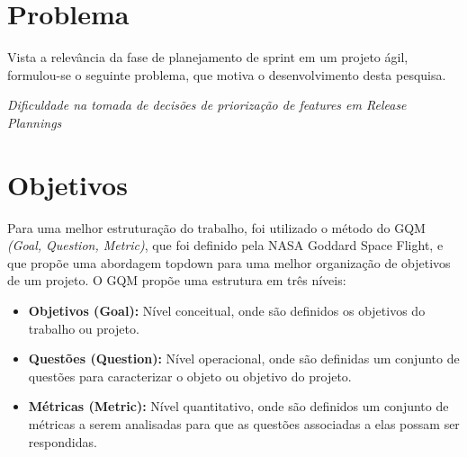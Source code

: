\section{Problema}
\label{int:pro}
Vista a relevância da fase de planejamento de sprint em um projeto ágil,
formulou-se o seguinte problema, que motiva o desenvolvimento desta pesquisa.




\begin{center}
 \textit{Dificuldade na tomada de decisões de priorização de features em
  Release Plannings}
\end{center}


\section{Objetivos}
\label{int:obj}
Para uma melhor estruturação do trabalho, foi utilizado o método do
GQM \textit{(Goal, Question, Metric)}, que foi definido pela NASA Goddard Space
Flight, e que propõe uma abordagem topdown para uma melhor organização de objetivos
de um projeto. O GQM propõe uma estrutura em três níveis\cite{gqm}:

\begin{itemize}
    \item \textbf{Objetivos (Goal):} Nível conceitual, onde são definidos os
        objetivos do trabalho ou projeto.
    \item \textbf{Questões (Question):} Nível operacional, onde são definidas um
        conjunto de questões para caracterizar o objeto ou objetivo do projeto.
    \item \textbf{Métricas (Metric):} Nível quantitativo, onde são definidos um
        conjunto de métricas a serem analisadas para que as questões associadas
        a elas possam ser respondidas.
\end{itemize}



